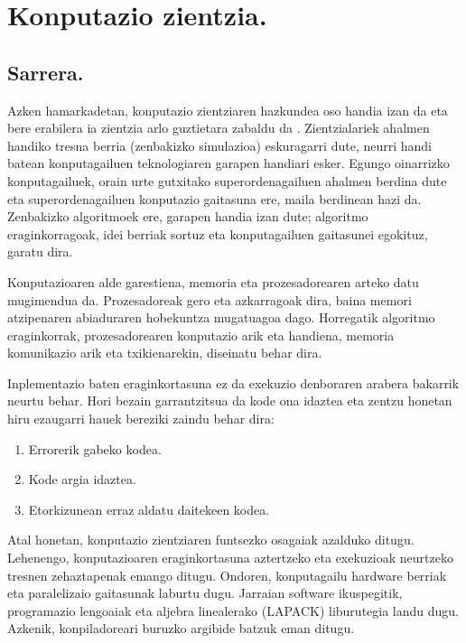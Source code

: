 \chapter{Konputazio zientzia.}


\section{Sarrera.}

Azken hamarkadetan,  konputazio zientziaren hazkundea oso handia izan da eta bere erabilera ia zientzia arlo guztietara zabaldu da \cite{Goedecker2001}. Zientzialariek ahalmen handiko tresna berria (zenbakizko simulazioa) eskuragarri dute, neurri handi batean konputagailuen teknologiaren garapen handiari esker. Egungo oinarrizko konputagailuek, orain urte gutxitako superordenagailuen ahalmen berdina dute eta superordenagailuen konputazio gaitasuna ere, maila berdinean hazi da. Zenbakizko algoritmoek ere, garapen handia izan dute; algoritmo eraginkorragoak, idei berriak sortuz eta konputagailuen gaitasunei egokituz, garatu dira.

Konputazioaren alde garestiena, memoria eta prozesadorearen arteko datu mugimendua da. Prozesadoreak gero eta azkarragoak dira, baina memori atzipenaren abiaduraren hobekuntza mugatuagoa dago. Horregatik algoritmo eraginkorrak, prozesadorearen konputazio arik eta handiena,  memoria komunikazio arik eta txikienarekin, diseinatu behar dira.      
 
Inplementazio baten eraginkortasuna ez da exekuzio denboraren arabera bakarrik neurtu behar. Hori bezain garrantzitsua da kode ona idaztea \cite{Wilson2014} eta zentzu honetan hiru ezaugarri hauek bereziki zaindu behar dira:
\begin{enumerate}
\item Errorerik gabeko kodea.
\item Kode argia idaztea.
\item Etorkizunean erraz aldatu daitekeen kodea.
\end{enumerate}

Atal honetan,  konputazio zientziaren funtsezko osagaiak azalduko ditugu. Lehenengo, konputazioaren eraginkortasuna aztertzeko eta exekuzioak neurtzeko tresnen zehaztapenak emango ditugu. Ondoren, konputagailu hardware berriak eta paralelizaio gaitasunak laburtu dugu. Jarraian software ikuspegitik, programazio lengoaiak eta aljebra linealerako (LAPACK) liburutegia landu dugu. Azkenik, konpiladoreari buruzko argibide batzuk eman ditugu.

